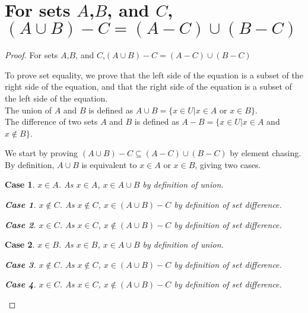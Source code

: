 \documentclass[12pt]{article}
\newtheorem{case}{Case}
\newtheorem{subcase}{Case}
\numberwithin{subcase}{case}
\begin{document}
\section*{For sets $A$,$B$, and $C$,$(A\cup B) - C = (A - C) \cup (B - C)$}
\begin{proof} 

For sets $A$,$B$, and $C$,$(A\cup B) - C = (A - C) \cup (B - C)$

To prove set equality, we prove that the left side of the equation is a subset of the right side of the
equation, and that the right side of the equation is a subset of the left side of the equation.\\
The union of $A$ and $B$ is defined as $A \cup B = \{ x \in U | x \in A$ or $x \in B\}$.\\
The difference of two sets $A$ and $B$ is defined as $A - B = \{x \in U | x \in A$ and $x \not\in B\}$.

We start by proving $(A\cup B) - C \subseteq (A - C) \cup (B - C)$ by element chasing.
By definition, $A \cup B$ is equivalent to $x \in A$ or $x \in B$, giving two cases.
\begin{case}
$x \in A$. As $x \in A$, $x \in A \cup B$ by definition of union.
  \begin{subcase}
    $x \not\in C$. As $x \not\in C$, $x \in (A\cup B) - C$ by definition of set difference.
  \end{subcase}
  \begin{subcase}
    $x \in C$. As $x \in C$, $x \not\in (A \cup B) - C$ by definition of set difference.
  \end{subcase}
\end{case}
\begin{case}
  $x \in B$. As $x \in B$, $x \in A \cup B$ by definition of union.
  \begin{subcase}
    $x \not\in C$. As $x \not\in C$, $x \in (A\cup B) - C$ by definition of set difference.
  \end{subcase}
  \begin{subcase}
    $x \in C$. As $x \in C$, $x \not\in (A \cup B) - C$ by definition of set difference.
  \end{subcase}
\end{case}


\end{proof}
\end{document}
